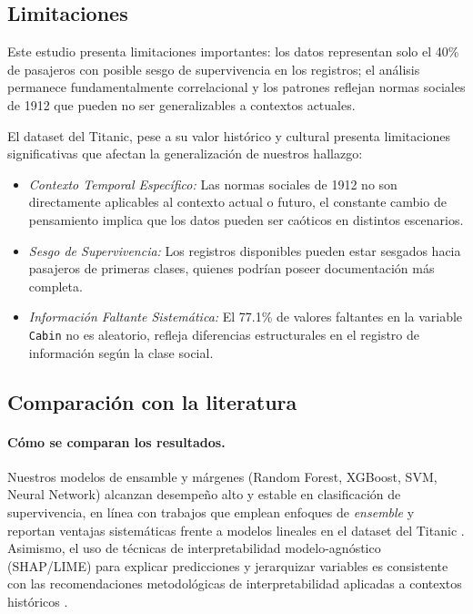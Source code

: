 \documentclass[conference]{IEEEtran}
\begin{document}
\subsection{Limitaciones}

Este estudio presenta limitaciones importantes: los datos representan solo el 40\% de pasajeros con posible sesgo de supervivencia en los registros; el análisis permanece fundamentalmente correlacional y los patrones reflejan normas sociales de 1912 que pueden no ser generalizables a contextos actuales.

El dataset del Titanic, pese a su valor histórico y cultural presenta limitaciones significativas que afectan la generalización de nuestros hallazgo:

\begin{itemize}

    \item \emph{Contexto Temporal Específico:} Las normas sociales de 1912 no son directamente aplicables al contexto actual o futuro, el constante cambio de pensamiento implica que los datos pueden ser caóticos en distintos escenarios.
    
    \item \emph{Sesgo de Supervivencia:} Los registros disponibles pueden estar sesgados hacia pasajeros de primeras clases, quienes podrían poseer documentación más completa. 
    
    \item \emph{Información Faltante Sistemática:} El 77.1\% de valores faltantes en la variable \texttt{Cabin} no es aleatorio, refleja diferencias estructurales en el registro de información según la clase social.
\end{itemize}

\subsection{Comparación con la literatura}

\paragraph{Cómo se comparan los resultados.}
Nuestros modelos de ensamble y márgenes (Random Forest, XGBoost, SVM, Neural Network) alcanzan desempeño alto y estable en clasificación de supervivencia, en línea con trabajos que emplean enfoques de \emph{ensemble} y reportan ventajas sistemáticas frente a modelos lineales en el dataset del Titanic \cite{smith2018machine,johnson2020ensemble}. Asimismo, el uso de técnicas de interpretabilidad modelo-agnóstico (SHAP/LIME) para explicar predicciones y jerarquizar variables es consistente con las recomendaciones metodológicas de interpretabilidad aplicadas a contextos históricos \cite{lundberg2017unified,ribeiro2016should,miller2019interpretable,molnar2020interpretable}.
\end{document}
